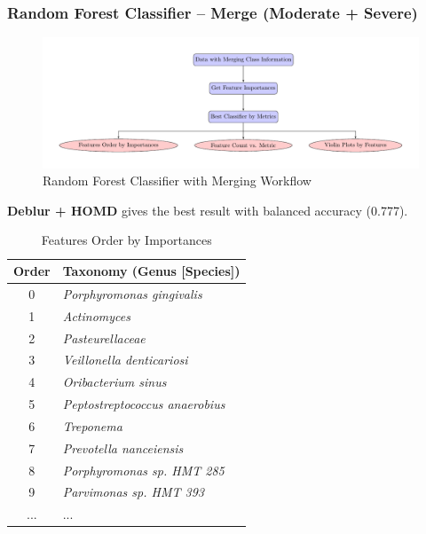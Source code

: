 \documentclass{beamer}
\begin{document}
    \begin{frame}[allowframebreaks]
        \frametitle{Random Forest Classifier -- Merge (Moderate + Severe)}

        \begin{figure}
            \includegraphics[width=0.8 \linewidth]{figures/RandomForest/merge.pdf}
            \caption{Random Forest Classifier with Merging Workflow}
        \end{figure}

        \textbf{Deblur + HOMD} gives the best result with balanced accuracy (0.777).

        \begin{table}
            \caption{Features Order by Importances}
            \begin{tabular}{c|l}
                Order & Taxonomy (Genus [Species]) \\ \hline
                0 & \textit{Porphyromonas gingivalis} \\
                1 & \textit{Actinomyces} \\
                2 & \textit{Pasteurellaceae} \\
                3 & \textit{Veillonella denticariosi} \\
                4 & \textit{Oribacterium sinus} \\
                5 & \textit{Peptostreptococcus anaerobius} \\
                6 & \textit{Treponema} \\
                7 & \textit{Prevotella nanceiensis} \\
                8 & \textit{Porphyromonas sp. HMT 285} \\
                9 & \textit{Parvimonas sp. HMT 393} \\
                ... & ... \\
            \end{tabular}
        \end{table}


\end{frame}
\end{document}
